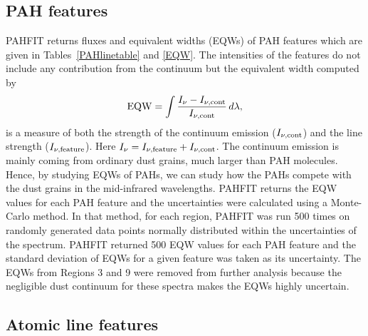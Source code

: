 \subsection{PAH features}
\label{sect:pah}

PAHFIT returns fluxes and equivalent widths (EQWs) of PAH features which are given in Tables~\ref{PAHlinetable} and \ref{EQW}. The intensities of the features do not include any contribution from the continuum but the equivalent width computed by
\begin{equation}
{\rm EQW}=\int \frac{I_{\nu} - I_{\nu, {\rm cont}}}{I_{\nu, {\rm cont}}} \,d\lambda,
\end{equation}
is a measure of both the strength of the continuum emission ($I_{\nu, {\rm cont}} $) and the line strength ($I_{\nu,{\rm feature}}$). 
Here $I_{\nu} =I_{\nu,{\rm feature}}+ I_{\nu, {\rm cont}} $. 
The continuum emission is mainly coming from ordinary dust grains, much larger than PAH molecules. Hence, by studying EQWs of PAHs, 
we can study how the PAHs compete with the dust grains in the mid-infrared wavelengths.  PAHFIT returns the EQW values for each PAH 
feature and the uncertainties were calculated using a Monte-Carlo method. In that method, for each region, PAHFIT was run 500 times on 
randomly generated data points  normally distributed within the uncertainties of the spectrum. PAHFIT returned 500 EQW values for each 
PAH feature and the standard deviation of EQWs for a given feature was taken as its uncertainty. 
The EQWs from Regions 3 and 9 were removed from further analysis because the negligible dust continuum for these spectra makes
the EQWs highly uncertain.


\subsection{Atomic line features}
\label{sect:atomic}

